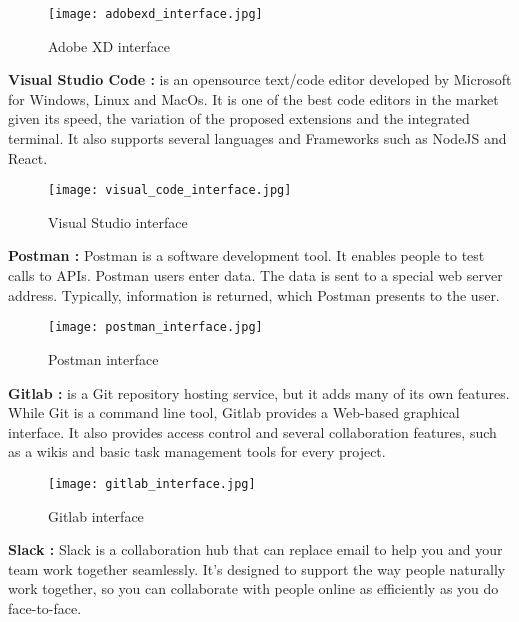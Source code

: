 \vfill
\clearpage

\begin{figure}[!ht]
    \centering
    \texttt{[image: adobexd\_interface.jpg]}
    \caption{Adobe XD interface}
    \label{fig:adobexd_interface}
\end{figure}

\hfill \break
\hfill \break
\textbf{Visual Studio Code \cite{cite7} :} is an opensource text/code editor developed by Microsoft for Windows, Linux and MacOs. It is one of the best code editors in the market given its speed, the variation of the proposed extensions and the integrated terminal. It also supports several languages and Frameworks such as NodeJS and React.

\begin{figure}[!ht]
    \centering
    \texttt{[image: visual\_code\_interface.jpg]}
    \caption{Visual Studio interface}
    \label{fig:visual_code_interface}
\end{figure}

\hfill \break
\hfill \break
\textbf{Postman \cite{cite5} :} Postman is a software development tool. It enables people to test calls to APIs. Postman users enter data. The data is sent to a special web server address. Typically, information is returned, which Postman presents to the user.

\begin{figure}[!ht]
    \centering
    \texttt{[image: postman\_interface.jpg]}
    \caption{Postman interface}
    \label{fig:postman_interface}
\end{figure}


\hfill \break
\hfill \break
\textbf{Gitlab \cite{cite8} :} is a Git repository hosting service, but it adds many of its own features. While Git is a command line tool, Gitlab provides a Web-based graphical interface. It also provides access control and several collaboration features, such as a wikis and basic task management tools for every project.


\begin{figure}[!ht]
    \centering
    \texttt{[image: gitlab\_interface.jpg]}
    \caption{Gitlab interface}
    \label{fig:gitlab_interface}
\end{figure}

\vfill
\clearpage

\hfill \break
\hfill \break
\textbf{Slack \cite{cite6} :} Slack is a collaboration hub that can replace email to help you and your team work together seamlessly. It’s designed to support the way people naturally work together, so you can collaborate with people online as efficiently as you do face-to-face.

